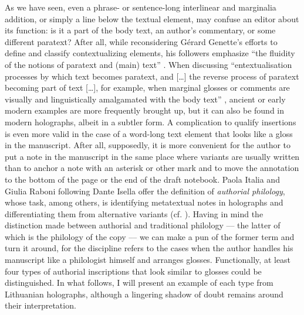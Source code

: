 \begin{paper}
As we have seen, even a phrase- or sentence-long interlinear and
marginalia addition, or simply a line below the textual element, may
confuse an editor about its function: is it a part of the
body text, an author's commentary, or some different paratext? After
all, while reconsidering Gérard Genette's efforts to define and classify
contextualizing elements, his followers emphasize ``the fluidity of the
notions of paratext and (main) text'' \citep*[21]{bos_framing_2020}. When
discussing ``entextualisation processes by which text becomes paratext,
and [\ldots] the reverse process of paratext becoming part of text
[\ldots], for example, when marginal glosses or comments are visually
and linguistically amalgamated with the body text'' \citep[21]{bos_framing_2020}, ancient or early modern examples are more frequently brought
up, but it can also be found in modern holographs, albeit in a subtler
form. A complication to qualify insertions is even more valid in the
case of a word-long text element that looks like a gloss in the
manuscript. After all, supposedly, it is more convenient for the author
to put a note in the manuscript in the same place where variants are
usually written than to anchor a note with an asterisk or other mark and
to move the annotation to the bottom of the page or the end of the draft
notebook. Paola Italia and Giulia Raboni following Dante Isella offer
the definition of \emph{authorial philology}, whose task, among others,
is identifying metatextual notes in holographs and differentiating them
from alternative variants (cf. \citealt[57--58]{italia_what_2021}).
Having in mind the distinction made between authorial and traditional
philology –– the latter of which is the philology of the copy –– we
can make a pun of the former term and turn it around, for the discipline
refers to the cases when the author handles his manuscript like a
philologist himself and arranges glosses. Functionally, at least four
types of authorial inscriptions that look similar to glosses could be
distinguished. In what follows, I will present an example of each type from Lithuanian
holographs, although a lingering shadow of doubt remains around their
interpretation.


\end{paper}
